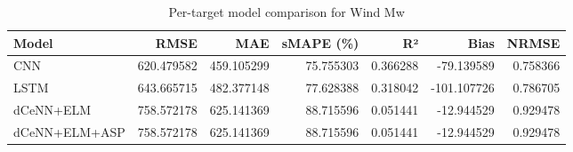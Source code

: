 \begin{table}
\caption{Per-target model comparison for Wind Mw}
\begin{tabular}{lrrrrrr}
\toprule
Model & RMSE & MAE & sMAPE (\%) & R² & Bias & NRMSE \\
\midrule
CNN & 620.479582 & 459.105299 & 75.755303 & 0.366288 & -79.139589 & 0.758366 \\
LSTM & 643.665715 & 482.377148 & 77.628388 & 0.318042 & -101.107726 & 0.786705 \\
dCeNN+ELM & 758.572178 & 625.141369 & 88.715596 & 0.051441 & -12.944529 & 0.929478 \\
dCeNN+ELM+ASP & 758.572178 & 625.141369 & 88.715596 & 0.051441 & -12.944529 & 0.929478 \\
\bottomrule
\end{tabular}
\end{table}
